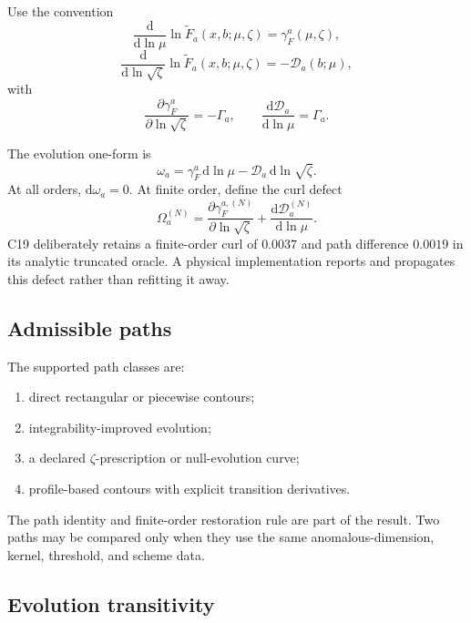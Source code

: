 \documentclass[11pt]{article}
\newcommand{\dd}{\mathrm{d}}
\begin{document}
Use the convention
\begin{equation}
 \frac{\dd}{\dd\ln\mu}
 \ln\widetilde F_a(x,b;\mu,\zeta)
 =
 \gamma_F^a(\mu,\zeta),
 \label{eq:mu-evolution}
\end{equation}
\begin{equation}
 \frac{\dd}{\dd\ln\sqrt\zeta}
 \ln\widetilde F_a(x,b;\mu,\zeta)
 =
 -\mathcal D_a(b;\mu),
 \label{eq:zeta-evolution}
\end{equation}
with
\begin{equation}
 \frac{\partial\gamma_F^a}{\partial\ln\sqrt\zeta}
 =-\Gamma_a,
 \qquad
 \frac{\dd\mathcal D_a}{\dd\ln\mu}=\Gamma_a.
 \label{eq:integrability}
\end{equation}

The evolution one-form is
\begin{equation}
 \omega_a
 =
 \gamma_F^a\,\dd\ln\mu
 -
 \mathcal D_a\,\dd\ln\sqrt\zeta.
 \label{eq:evolution-one-form}
\end{equation}
At all orders, \(\dd\omega_a=0\).  At finite order, define the curl defect
\begin{equation}
 \Omega_a^{(N)}
 =
 \frac{\partial\gamma_F^{a,(N)}}{\partial\ln\sqrt\zeta}
 +
 \frac{\dd\mathcal D_a^{(N)}}{\dd\ln\mu}.
 \label{eq:curl-defect}
\end{equation}
C19 deliberately retains a finite-order curl of \(0.0037\) and path difference \(0.0019\) in its analytic truncated oracle.  A physical implementation reports and propagates this defect rather than refitting it away.

\subsection{Admissible paths}

The supported path classes are:
\begin{enumerate}
\item direct rectangular or piecewise contours;
\item integrability-improved evolution;
\item a declared \(\zeta\)-prescription or null-evolution curve;
\item profile-based contours with explicit transition derivatives.
\end{enumerate}
The path identity and finite-order restoration rule are part of the result.  Two paths may be compared only when they use the same anomalous-dimension, kernel, threshold, and scheme data.

\subsection{Evolution transitivity}
\end{document}
